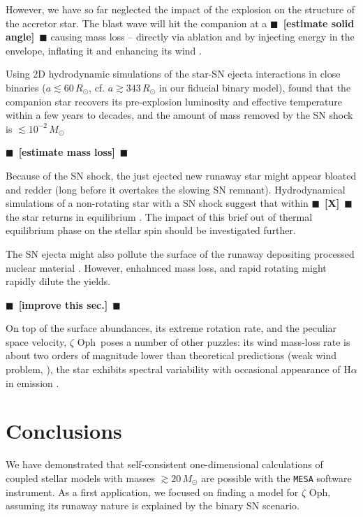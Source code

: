 \documentclass[twocolumn,twocolappendix,trackchanges]{aastex63}
\newcommand{\zoph}{$\zeta$ Oph}
\newcommand{\todo}[1]{{\large $\blacksquare$~\textbf{\color{red}[#1]}}~$\blacksquare$}
\begin{document}
However, we have so far neglected the impact of the explosion on the
structure of the accretor star. The blast wave will hit the companion
at a \todo{estimate solid angle} causing mass loss -- directly via
ablation and by injecting energy in the envelope, inflating it and
enhancing its wind \citep{wheeler:75, tauris:98, podsiadlowski:03, hirai:18}.

Using 2D hydrodynamic simulations of the star-SN ejecta interactions
in close binaries ($a\lesssim 60\,R_\odot$,
cf. $a\gtrsim 343\,R_\odot$ in our fiducial binary model),
\cite{hirai:18} found that the companion star recovers its pre-explosion
luminosity and effective temperature within a few years to decades,
and the amount of mass removed by the SN shock is $\lesssim10^{-2}\,M_\odot$



\todo{estimate mass loss}


Because of the SN shock, the just ejected new runaway star might
appear bloated and redder (long before it overtakes the slowing SN
remnant). Hydrodynamical simulations of a non-rotating star
with a SN shock suggest that within \todo{X} the star returns
in equilibrium \cite{hirai:18}. The impact of this brief out of
thermal equilibrium phase on the stellar spin should be investigated
further.

The SN ejecta might also pollute the surface of the runaway depositing
processed nuclear material \citep[e.g.][]{przybilla:08}. However,
enhahnced mass loss, and rapid rotating might rapidly dilute the
yields.

\todo{improve this sec.}


On top of the surface abundances, its extreme rotation rate, and the
peculiar space velocity, \zoph\ poses a number of other
puzzles: its wind mass-loss rate is about two orders of magnitude
lower than theoretical predictions (weak wind problem,
\citealt{marcolino:09}), the star exhibits spectral variability with
occasional appearance of H$\alpha$ in emission
\citep[e.g.,][]{walker:79}.


\section{Conclusions}
\label{sec:conclusions}

We have demonstrated that self-consistent one-dimensional calculations
of coupled stellar models with masses $\gtrsim 20\,M_\odot$ are
possible with the \texttt{MESA} software instrument. As a first
application, we focused on finding a model for \zoph, assuming its
runaway nature is explained by the binary SN scenario.
\end{document}
